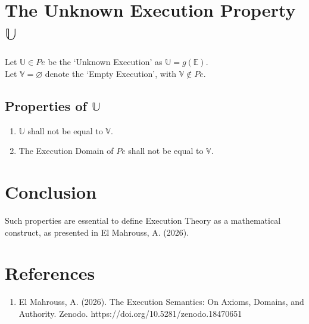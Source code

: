 \documentclass[11pt,a4paper]{article}
\begin{document}
\section{The Unknown Execution Property $\mathbb{U}$}

Let $\mathbb{U} \in Pe$ be the `Unknown Execution' as $\mathbb{U} = g(\mathbb{E})$.\\
Let $\mathbb{V} = \varnothing$ denote the `Empty Execution', with $\mathbb{V} \notin Pe$.

\subsection{Properties of $\mathbb{U}$}

\begin{enumerate}

    \item $\mathbb{U}$ shall not be equal to $\mathbb{V}$.
    \item The Execution Domain of $Pe$ shall not be equal to $\mathbb{V}$.

\end{enumerate}

\section{Conclusion}

Such properties are essential to define Execution Theory as a mathematical construct, as presented in El Mahrouss, A. (2026).

\section{References}

\begin{enumerate}
    \item El Mahrouss, A. (2026). The Execution Semantics: On Axioms, Domains, and Authority. Zenodo. https://doi.org/10.5281/zenodo.18470651
\end{enumerate}
\end{document}
